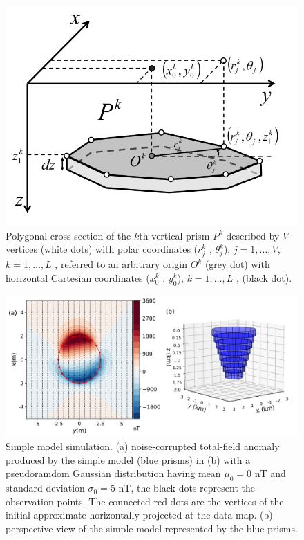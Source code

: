 \begin{figure}
    \centering
    \includegraphics[scale=0.3]{figures/prism_parameters_mod.png}
    \caption{Polygonal cross-section of the $k$th vertical prism $P^k$ described by $V$ vertices (white dots) with polar coordinates ($r^k_j$ , $\theta ^k_j$), $j = 1, \dots, V$, $k = 1, \dots, L$ , referred to an arbitrary origin $O^k$ (grey dot) with horizontal Cartesian coordinates ($x_0^k$ , $y_0^k$), $k = 1, \dots, L$ , (black dot).}
    \label{fig:prism_parameters}
\end{figure}


\begin{figure}
    \centering
    \includegraphics[scale=.5]{figures/simple_model_data.png}
    \caption{Simple model simulation. (a) noise-corrupted total-field anomaly produced by the simple model (blue prisms) in (b) with a pseudoramdom Gaussian distribution having mean $\mu_0 = 0$ nT and standard deviation $\sigma_0 = 5$ nT, the black dots represent the observation points. The connected red dots are the vertices of the initial approximate horizontally projected at the data map. (b) perspective view of the simple model represented by the blue prisms.
}
    \label{fig:simple_model}
\end{figure}

